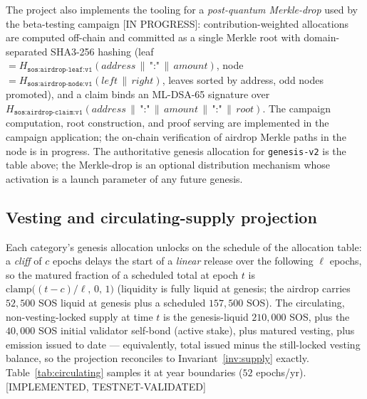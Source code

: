 \documentclass[11pt]{article}
\newcommand{\code}[1]{\texttt{#1}}
\newcommand{\mldsa}{ML\mbox{-}DSA\mbox{-}65}
\newcommand{\sha}{SHA3\mbox{-}256}
\newcommand{\concat}{\,\|\,}
\newcommand{\statusV}{\textcolor{statgreen}{\textsf{\scriptsize[IMPLEMENTED, TESTNET-VALIDATED]}}}
\newcommand{\statusP}{\textcolor{statblue}{\textsf{\scriptsize[IN PROGRESS]}}}
\theoremstyle{plain}
\theoremstyle{definition}
\theoremstyle{remark}
\begin{document}
The project also implements the tooling for a
\emph{post-quantum Merkle-drop} used by the beta-testing campaign
\statusP{}: contribution-weighted allocations are computed off-chain and
committed as a single Merkle root with domain-separated \sha{} hashing
(leaf $= H_{\code{sos:airdrop-leaf:v1}}(\mathit{address} \concat
\code{":"} \concat \mathit{amount})$, node
$= H_{\code{sos:airdrop-node:v1}}(\mathit{left} \concat \mathit{right})$,
leaves sorted by address, odd nodes promoted), and a claim binds an \mldsa{}
signature over $H_{\code{sos:airdrop-claim:v1}}(\mathit{address} \concat
\code{":"} \concat \mathit{amount} \concat \code{":"} \concat \mathit{root})$.
The campaign computation, root construction, and proof serving are
implemented in the campaign application; the on-chain verification of
airdrop Merkle paths in the node is in progress. The
authoritative genesis allocation for \code{genesis-v2} is the table above; the
Merkle-drop is an optional distribution mechanism whose
activation is a launch parameter of any future genesis.

\subsection{Vesting and circulating-supply projection}
\label{sec:vesting}

Each category's genesis allocation unlocks on the schedule of the allocation
table: a \emph{cliff} of $c$ epochs delays the start of a \emph{linear} release
over the following $\ell$ epochs, so the matured fraction of a scheduled total
at epoch $t$ is $\mathrm{clamp}\big((t-c)/\ell,\,0,\,1\big)$ (liquidity is fully
liquid at genesis; the airdrop carries $52{,}500$ SOS liquid at genesis plus a
scheduled $157{,}500$ SOS). The circulating, non-vesting-locked supply at time
$t$ is the genesis-liquid $210{,}000$ SOS, plus the $40{,}000$ SOS initial
validator self-bond (active stake), plus matured vesting, plus emission issued
to date --- equivalently, total issued minus the still-locked vesting balance,
so the projection reconciles to Invariant~\ref{inv:supply} exactly.
Table~\ref{tab:circulating} samples it at year boundaries ($52$ epochs/yr).
\statusV{}
\end{document}
